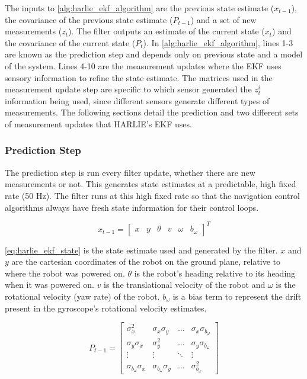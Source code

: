 The inputs to \autoref{alg:harlie_ekf_algorithm} are the previous state estimate ($x_{t-1}$), the covariance of the previous state estimate ($P_{t-1}$) and a set of new measurements ($z_t$). The filter outputs an estimate of the current state ($x_t$) and the covariance of the current state ($P_t$). In \autoref{alg:harlie_ekf_algorithm}, lines 1-3 are known as the prediction step and depends only on previous state and a model of the system. Lines 4-10 are the measurement updates where the EKF uses sensory information to refine the state estimate. The matrices used in the measurement update step are specific to which sensor generated the $z^i_t$ information being used, since different sensors generate different types of measurements. The following sections detail the prediction and two different sets of measurement updates that HARLIE's EKF uses.

\subsubsection{Prediction Step}\label{subsubsec:harlie_ekf_prediction}

The prediction step is run every filter update, whether there are new measurements or not. This generates state estimates at a predictable, high fixed rate (50 Hz). The filter runs at this high fixed rate so that the navigation control algorithms always have fresh state information for their control loops.

\begin{equation}
	x_{t-1} = 
	\begin{bmatrix}
		x &
		y &
		\theta &
		v &
		\omega &
		b_{\omega}
	\end{bmatrix}^T
	\label{eq:harlie_ekf_state}
\end{equation}

\eqref{eq:harlie_ekf_state} is the state estimate used and generated by the filter. $x$ and $y$ are the cartesian coordinates of the robot on the ground plane, relative to where the robot was powered on. $\theta$ is the robot's heading relative to its heading when it was powered on. $v$ is the translational velocity of the robot and $\omega$ is the rotational velocity (yaw rate) of the robot. $b_{\omega}$ is a bias term to represent the drift present in the gyroscope's rotational velocity estimates.

\begin{equation}
	P_{t-1} =
	\begin{bmatrix}
		\sigma_x^2 & \sigma_x\sigma_y & \ldots & \sigma_x\sigma_{b_{\omega}} \\
		\sigma_y\sigma_x & \sigma_y^2 & \ldots & \sigma_y\sigma_{b_{\omega}} \\
		\vdots & \vdots & \ddots & \vdots \\
		\sigma_{b_{\omega}}\sigma_x & \sigma_{b_{\omega}}\sigma_y & 
			\ldots & \sigma_{b_{\omega}}^2
	\end{bmatrix}
	\label{eq:harlie_ekf_state_covariance}
\end{equation}

